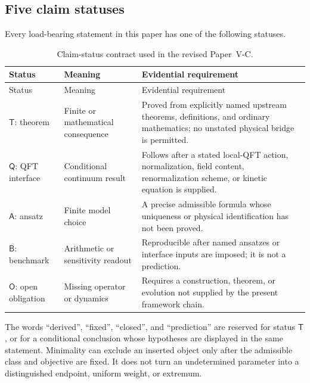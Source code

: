 \documentclass[12pt,a4paper]{article}
\begin{document}
\subsection{Five claim statuses}
\label{p7v2:sec:status-contract}

\begin{definition}
\label{p7v2:def:claim-status}
Every load-bearing statement in this paper has one of the following statuses.
\begin{longtable}{@{}L{0.16\textwidth}L{0.29\textwidth}L{0.47\textwidth}@{}}
\caption[Paper--V-C claim-status contract]{Claim-status contract used in the
revised Paper~V-C.}\label{p7v2:tab:status-contract}\\
\toprule
Status & Meaning & Evidential requirement\\
\midrule
\endfirsthead
\toprule
Status & Meaning & Evidential requirement\\
\midrule
\endhead
\(\mathsf T\): theorem
& Finite or mathematical consequence
& Proved from explicitly named upstream theorems, definitions, and ordinary
mathematics; no unstated physical bridge is permitted.\\
\(\mathsf Q\): QFT interface
& Conditional continuum result
& Follows after a stated local-QFT action, normalization, field content,
renormalization scheme, or kinetic equation is supplied.\\
\(\mathsf A\): ansatz
& Finite model choice
& A precise admissible formula whose uniqueness or physical identification has
not been proved.\\
\(\mathsf B\): benchmark
& Arithmetic or sensitivity readout
& Reproducible after named ansatzes or interface inputs are imposed; it is not a
prediction.\\
\(\mathsf O\): open obligation
& Missing operator or dynamics
& Requires a construction, theorem, or evolution not supplied by the present
framework chain.\\
\bottomrule
\end{longtable}
\end{definition}

The words ``derived'', ``fixed'', ``closed'', and ``prediction'' are reserved
for status \(\mathsf T\), or for a conditional conclusion whose hypotheses are
displayed in the same statement.  Minimality can exclude an inserted object
only after the admissible class and objective are fixed.  It does not turn an
undetermined parameter into a distinguished endpoint, uniform weight, or
extremum.
\end{document}

